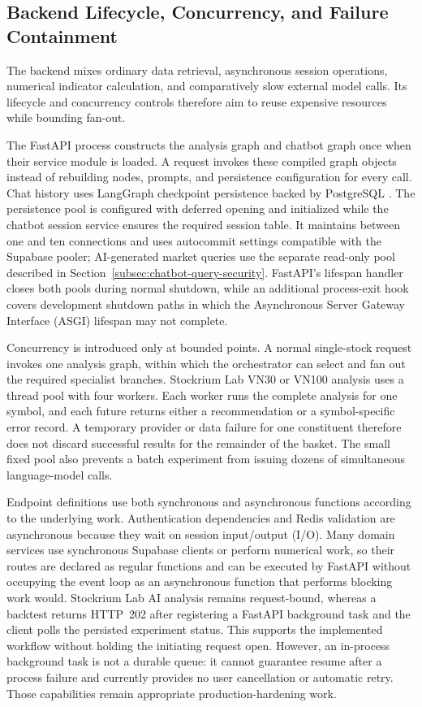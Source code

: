 \subsection{Backend Lifecycle, Concurrency, and Failure Containment}
\label{subsec:backend-lifecycle-concurrency}

The backend mixes ordinary data retrieval, asynchronous session operations, numerical indicator calculation, and comparatively slow external model calls. Its lifecycle and concurrency controls therefore aim to reuse expensive resources while bounding fan-out.

The FastAPI process constructs the analysis graph and chatbot graph once when their service module is loaded. A request invokes these compiled graph objects instead of rebuilding nodes, prompts, and persistence configuration for every call. Chat history uses LangGraph checkpoint persistence backed by PostgreSQL \cite{langgraphPersistence2026}. The persistence pool is configured with deferred opening and initialized while the chatbot session service ensures the required session table. It maintains between one and ten connections and uses autocommit settings compatible with the Supabase pooler; AI-generated market queries use the separate read-only pool described in Section~\ref{subsec:chatbot-query-security}. FastAPI's lifespan handler closes both pools during normal shutdown, while an additional process-exit hook covers development shutdown paths in which the Asynchronous Server Gateway Interface (ASGI) lifespan may not complete.

Concurrency is introduced only at bounded points. A normal single-stock request invokes one analysis graph, within which the orchestrator can select and fan out the required specialist branches. Stockrium Lab VN30 or VN100 analysis uses a thread pool with four workers. Each worker runs the complete analysis for one symbol, and each future returns either a recommendation or a symbol-specific error record. A temporary provider or data failure for one constituent therefore does not discard successful results for the remainder of the basket. The small fixed pool also prevents a batch experiment from issuing dozens of simultaneous language-model calls.

Endpoint definitions use both synchronous and asynchronous functions according to the underlying work. Authentication dependencies and Redis validation are asynchronous because they wait on session input/output (I/O). Many domain services use synchronous Supabase clients or perform numerical work, so their routes are declared as regular functions and can be executed by FastAPI without occupying the event loop as an asynchronous function that performs blocking work would. Stockrium Lab AI analysis remains request-bound, whereas a backtest returns HTTP~202 after registering a FastAPI background task and the client polls the persisted experiment status. This supports the implemented workflow without holding the initiating request open. However, an in-process background task is not a durable queue: it cannot guarantee resume after a process failure and currently provides no user cancellation or automatic retry. Those capabilities remain appropriate production-hardening work.

